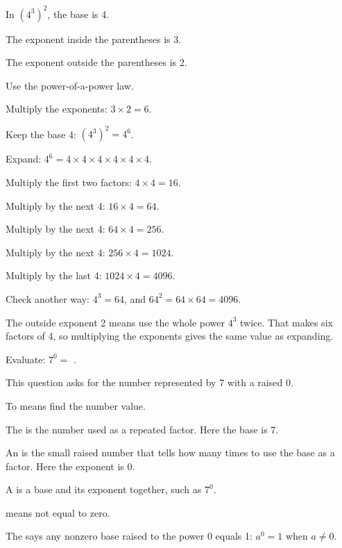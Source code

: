 \begin{steps}
  \item In $(4^{3})^{2}$, the base is 4.
  \item The exponent inside the parentheses is 3.
  \item The exponent outside the parentheses is 2.
  \item Use the power-of-a-power law.
  \item Multiply the exponents: $3 \times 2 = 6$.
  \item Keep the base 4: $(4^{3})^{2} = 4^{6}$.
  \item Expand: $4^{6} = 4 \times 4 \times 4 \times 4 \times 4 \times 4$.
  \item Multiply the first two factors: $4 \times 4 = 16$.
  \item Multiply by the next 4: $16 \times 4 = 64$.
  \item Multiply by the next 4: $64 \times 4 = 256$.
  \item Multiply by the next 4: $256 \times 4 = 1024$.
  \item Multiply by the last 4: $1024 \times 4 = 4096$.
  \item Check another way: $4^{3} = 64$, and $64^{2} = 64 \times 64 = 4096$.
\end{steps}


The outside exponent 2 means use the whole power $4^{3}$ twice. That makes six
factors of 4, so multiplying the exponents gives the same value as expanding.


Evaluate: $7^{0} = $ \blank[1.8cm].


This question asks for the number represented by 7 with a raised 0.

\begin{words}
  \item To means find the number value.
  \item The is the number used as a repeated factor. Here the base
    is 7.
  \item An is the small raised number that tells how many times to
    use the base as a factor. Here the exponent is 0.
  \item A is a base and its exponent together, such as $7^{0}$.
  \item {}means not equal to zero.
  \item The says any nonzero base raised to the power 0
    equals 1: $a^{0} = 1$ when $a \neq 0$.
\end{words}

